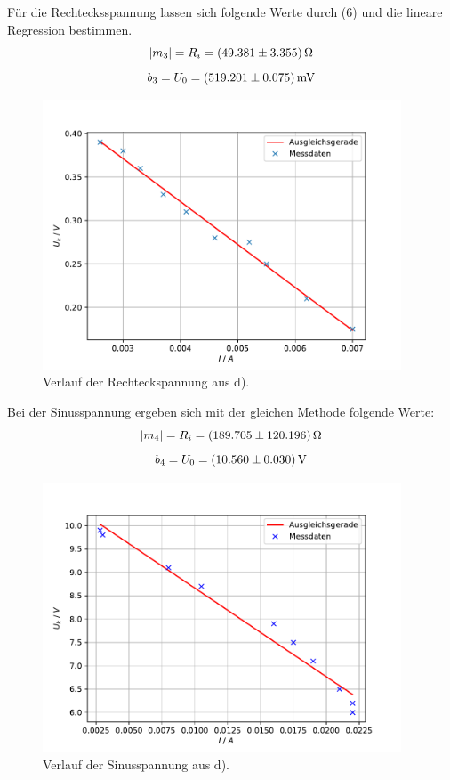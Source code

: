Für die Rechtecksspannung lassen sich folgende Werte durch (6) und die lineare Regression bestimmen.
\begin{equation}
    |m_3| = R_i = \SI{49,381 \pm 3,355}{\Omega} \notag
\end{equation}
\begin{equation}
    b_3 = U_0 = \SI{519,201 \pm 0,075}{mV} \notag
\end{equation}

\begin{figure}[h]
  \centering
  \includegraphics[height=8cm]{Auswertung/Rechteck.pdf}
  \caption{Verlauf der Rechteckspannung aus d).}
  \label{fig:Rechteck.pdf}
\end{figure}

Bei der Sinusspannung ergeben sich mit der gleichen Methode folgende Werte:
\begin{equation}
    |m_4| = R_i = \SI{189,705 \pm 120,196}{\Omega} \notag
\end{equation}
\begin{equation}
    b_4 = U_0 = \SI{10,560 \pm 0,030}{V} \notag
\end{equation}

\begin{figure}[h]
  \centering
  \includegraphics[height=8cm]{Auswertung/Sinusspannung.pdf}
  \caption{Verlauf der Sinusspannung aus d).}
  \label{fig:Sinusspannung.pdf}
\end{figure}

